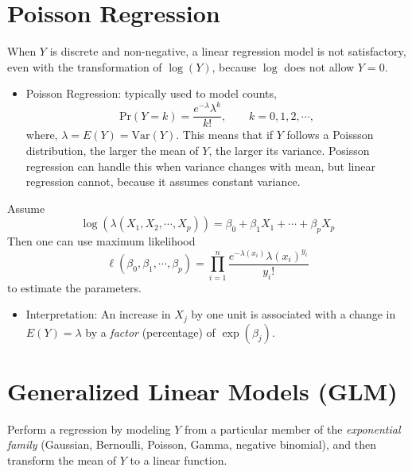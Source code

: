 \documentclass[
  letterpaper,
  DIV=11,
  numbers=noendperiod]{scrreprt}
\providecommand{\tightlist}{%
  \setlength{\itemsep}{0pt}\setlength{\parskip}{0pt}}\usepackage{longtable,booktabs,array}
\begin{document}
\section{Poisson Regression}\label{poisson-regression}

When \(Y\) is discrete and non-negative, a linear regression model is
not satisfactory, even with the transformation of \(\log (Y)\), because
\(\log\) does not allow \(Y=0\).

\begin{itemize}
\tightlist
\item
  Poisson Regression: typically used to model counts, \[
  \text{Pr}(Y=k)= \frac{e^{-\lambda}\lambda^k}{k!}, \qquad k=0,1,2, \cdots,
  \] where, \(\lambda = E(Y)= \text{Var}(Y)\). This means that if \(Y\)
  follows a Poissson distribution, the larger the mean of \(Y\), the
  larger its variance. Posisson regression can handle this when variance
  changes with mean, but linear regression cannot, because it assumes
  constant variance.
\end{itemize}

Assume \[
\log(\lambda(X_1, X_2, \cdots, X_p))=\beta_0+\beta_1X_1+\cdots +\beta_pX_p
\] Then one can use maximum likelihood \[
\ell(\beta_0, \beta_1, \cdots, \beta_p)=\prod_{i=1}^n \frac{e^{-\lambda(x_i)}\lambda(x_i)^{y_i}}{y_i!}
\] to estimate the parameters.

\begin{itemize}
\tightlist
\item
  Interpretation: An increase in \(X_j\) by one unit is associated with
  a change in \(E(Y)=\lambda\) by a \emph{factor} (percentage) of
  \(\exp(\beta_j)\).
\end{itemize}

\section{Generalized Linear Models
(GLM)}\label{generalized-linear-models-glm}

Perform a regression by modeling \(Y\) from a particular member of the
\emph{exponential family} (Gaussian, Bernoulli, Poisson, Gamma, negative
binomial), and then transform the mean of \(Y\) to a linear function.
\end{document}
